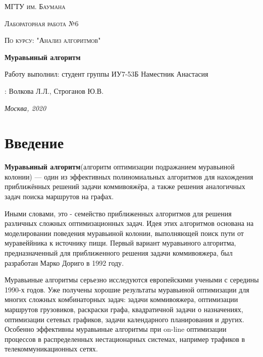 \documentclass[12pt]{report}
\begin{document}
 
\begin{titlepage}
	\centering
	{\scshape\LARGE МГТУ им. Баумана \par}
	\vspace{3cm}
	{\scshape\Large Лабораторная работа №6\par}
	\vspace{0.5cm}	
	{\scshape\Large По курсу: "Анализ алгоритмов"\par}
	\vspace{1.5cm}
	{\huge\bfseries Муравьиный алгоритм\par}
	\vspace{2cm}
	\Large Работу выполнил: студент группы ИУ7-53Б Наместник Анастасия\par
	\vspace{0.5cm}
	:  Волкова Л.Л., Строганов Ю.В.\par

	\vfill
	\large \textit {Москва, 2020} \par
\end{titlepage}

\tableofcontents

\newpage
\chapter*{Введение}

	\textbf{Муравьиный алгоритм}(алгоритм оптимизации подражанием муравьиной колонии) — один из эффективных полиномиальных алгоритмов для нахождения приближённых решений задачи коммивояжёра, а также решения аналогичных задач поиска маршрутов на графах\cite{OLNA}. 
	
Иными словами, это -  семейство приближенных алгоритмов для решения различных сложных оптимизационных задач. Идея этих алгоритмов основана на моделировании поведения муравьиной колонии, выполняющей поиск пути от муравеййника к источнику пищи. Первый вариант муравьиного алгоритма, предназначенный для приближенного решения задачи коммивояжера, был разработан Марко Дориго в 1992 году\cite{Lecture}.

Муравьиные алгоритмы серьезно исследуются европейскими учеными с середины 1990-х годов. Уже получены хорошие результаты муравьиной оптимизации для многих сложных комбинаторных задач: задачи коммивояжера, оптимизации маршрутов грузовиков, раскраски графа, квадратичной задачи о назначениях, оптимизации сетевых графиков, задачи календарного планирования и других. Особенно эффективны муравьиные алгоритмы при on-line оптимизации процессов в распределенных нестационарных системах, например трафиков в телекоммуникационных сетях\cite{AntAlg}.
\end{document}
